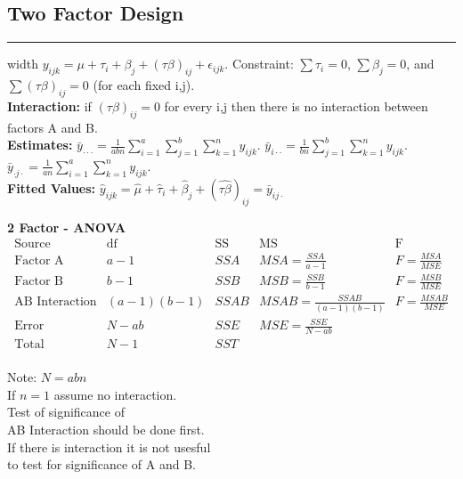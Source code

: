 \documentclass[10pt]{article}
\begin{document}
  \subsection*{Two Factor Design}
  \hrule width \textwidth
  \vspace{6pt}
  $y_{ijk} = \mu + \tau_i + \beta_j + (\tau \beta)_{ij} + \epsilon_{ijk}$. 
  Constraint: $\sum \tau_i = 0$, $\sum \beta_j = 0$, and $\sum (\tau \beta)_{ij} = 0$ (for each fixed i,j). \\
  \textbf{Interaction: } if $(\tau \beta)_{ij} = 0$ for every i,j then there is no interaction between factors A and B.\\
  \textbf{Estimates: } $\bar{y}_{\cdot \cdot \cdot} = \frac{1}{abn}\sum_{i=1}^{a} \sum_{j=1}^{b} \sum_{k=1}^{n} y_{ijk}$.
  $\bar{y}_{i \cdot \cdot} = \frac{1}{bn} \sum_{j=1}^{b} \sum_{k=1}^{n} y_{ijk}$.
  $\bar{y}_{\cdot j \cdot} = \frac{1}{an}\sum_{i=1}^{a} \sum_{k=1}^{n} y_{ijk}$. \\
  \textbf{Fitted Values: } $\hat{y}_{ijk} = \hat{\mu} + \hat{\tau}_i + \hat{\beta}_j + (\hat{\tau \beta})_{ij} = \bar{y}_{i j \cdot}$
  \begin{multicols}{2}
    \begin{flushleft}
      \textbf{2 Factor - ANOVA}
      \begin{equation*}
      \begin{array}{c|c|c|c|c}
        \text{Source} & \text{df} & \text{SS} & \text{MS} & \text{F}\\
          \hline
          \text{Factor A} & a - 1 & SSA & MSA = \frac{SSA}{a-1} & F= \frac{MSA}{MSE}\\
          \text{Factor B} & b - 1 & SSB & MSB = \frac{SSB}{b-1} & F= \frac{MSB}{MSE}\\
          \text{AB Interaction} & (a-1)(b-1) & SSAB & MSAB = \frac{SSAB}{(a-1)(b-1)} & F= \frac{MSAB}{MSE}\\
          \text{Error} & N - ab & SSE & MSE = \frac{SSE}{N - ab} & \\
          \hline
          \text{Total} & N -1 & SST & &\\
      \end{array}
    \end{equation*}
    \end{flushleft}
  
      \begin{flushright}
        Note: $N = abn$ \\
        If $n = 1$ assume no interaction. \\
        Test of significance of \\ AB Interaction should be done first. \\
        If there is interaction it is not usesful\\
        to test for significance of A and B.\\
      \end{flushright}
    \end{multicols}
\end{document}
